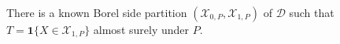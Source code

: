 There is a known Borel side partition \((\mathcal X_{0,P},\mathcal X_{1,P})\) of \(\mathcal D\) such that \(T=\mathbf 1\{X\in\mathcal X_{1,P}\}\) almost surely under \(P\).